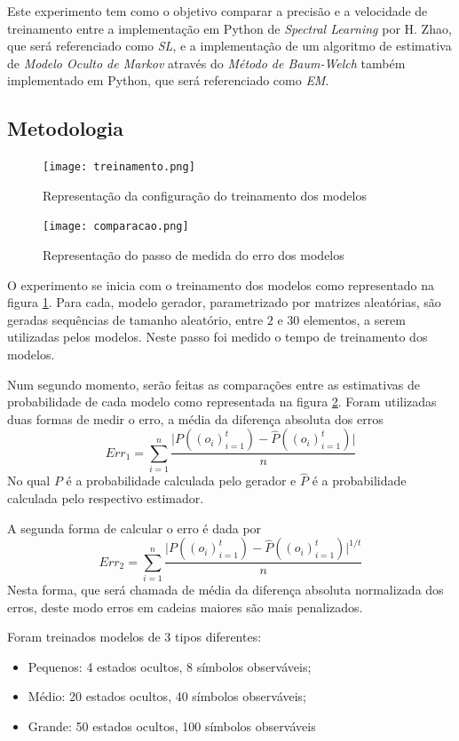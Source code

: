 \documentclass{subfiles}
\begin{document}
Este experimento tem como o objetivo comparar a precisão e a velocidade de treinamento entre a implementação em Python de \textit{Spectral Learning} por H. Zhao, que será referenciado como \textit{SL}, e a implementação de um algoritmo de estimativa de \textit{Modelo Oculto de Markov} através do \textit{Método de Baum-Welch} também implementado em Python, que será referenciado como \textit{EM}.

\subsection{Metodologia}

\begin{figure}
    \texttt{[image: treinamento.png]}
    \caption{Representação da configuração do treinamento dos modelos}
    \label{fig:trein}
\end{figure}

\begin{figure}
    \texttt{[image: comparacao.png]}
    \caption{Representação do passo de medida do erro dos modelos}
    \label{fig:comp}
\end{figure}

O experimento se inicia com o treinamento dos modelos como representado na figura \ref{fig:trein}. Para cada, modelo gerador, parametrizado por matrizes aleatórias, são geradas sequências de tamanho aleatório, entre $2$ e $30$ elementos, a serem utilizadas pelos modelos. Neste passo foi medido o tempo de treinamento dos modelos.

Num segundo momento, serão feitas as comparações entre as estimativas de probabilidade de cada modelo como representada na figura \ref{fig:comp}. Foram utilizadas duas formas de medir o erro, a média da diferença absoluta dos erros
\[
    Err_1 = \sum_{i=1}^n \frac{\vert P((o_i)_{i=1}^t) - \hat{P}((o_i)_{i=1}^t) \vert}{n}
\]
No qual $P$ é a probabilidade calculada pelo gerador e $\hat{P}$ é a probabilidade calculada pelo respectivo estimador.

A segunda forma de calcular o erro é dada por
\[
    Err_2 = \sum_{i=1}^n \frac{\vert P((o_i)_{i=1}^t) - \hat{P}((o_i)_{i=1}^t) \vert^{1/t}}{n}
\]
Nesta forma, que será chamada de média da diferença absoluta normalizada dos erros, deste modo erros em cadeias maiores são mais penalizados.

Foram treinados modelos de 3 tipos diferentes:
\begin{itemize}
    \item Pequenos: 4 estados ocultos, 8 símbolos observáveis;
    \item Médio: 20 estados ocultos, 40 símbolos observáveis;
    \item Grande: 50 estados ocultos, 100 símbolos observáveis
\end{itemize}
\end{document}
